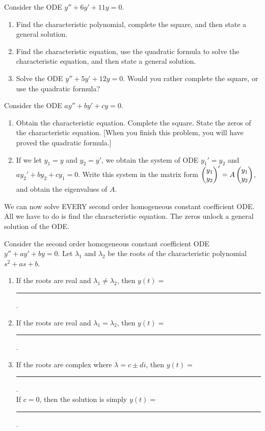 \begin{problem}
 Consider the ODE $y''+6y'+11y=0$.  
 \begin{enumerate}
  \item Find the characteristic polynomial, complete the square, and then state a general solution.
  \item Find the characteristic equation, use the quadratic formula to solve the characteristic equation, and then state a general solution.
  \item Solve the ODE $y''+5y'+12y=0$. Would you rather complete the square, or use the quadratic formula?
 \end{enumerate}
\end{problem}

\begin{problem}
 Consider the ODE $ay''+by'+cy=0$. 
\begin{enumerate}
 \item Obtain the characteristic equation. Complete the square.  State the zeros of the characteristic equation. [When you finish this problem, you will have proved the quadratic formula.]
 \item If we let $y_1=y$ and $y_2=y'$, we obtain the system of ODE $y_1'=y_2$ and $ay_2'+by_2+cy_1=0$.  
 Write this system in the  matrix form $\begin{pmatrix} y_1\\y_2 \end{pmatrix}' = A \begin{pmatrix} y_1\\y_2 \end{pmatrix}$, and obtain the eigenvalues of $A$.  
\end{enumerate}
\end{problem}

We can now solve EVERY second order homogeneous constant coefficient ODE.  All we have to do is find the characteristic equation. The zeros unlock a general solution of the ODE.
\begin{problem}
 Consider the second order homogeneous constant coefficient ODE $y''+ay'+by=0$.  Let $\lambda_1$ and $\lambda_2$ be the roots of the characteristic polynomial $s^2+as+b$.  
\begin{enumerate}
 \item If the roots are real and $\lambda_1 \neq \lambda_2$, then $y(t) = $\rule{1in}{.5pt}.
 \item If the roots are real and $\lambda_1  =   \lambda_2$, then $y(t) = $\rule{1in}{.5pt}.
 \item If the roots are complex where $\lambda = c\pm di$, then $y(t) = $\rule{1in}{.5pt}. \\
 If $c=0$, then the solution is simply $y(t) = $\rule{1in}{.5pt}.
\end{enumerate}

\end{problem}


